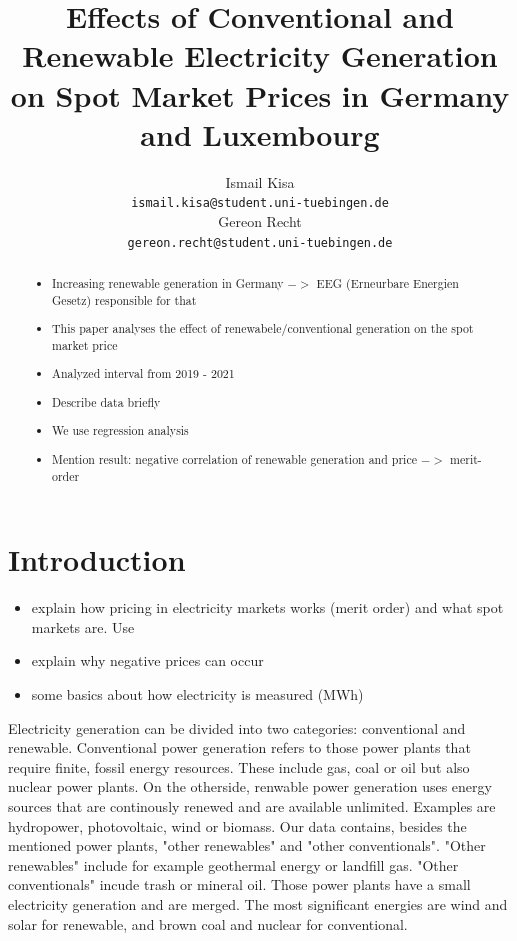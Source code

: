 \documentclass{article}
\title{Effects of Conventional and Renewable Electricity Generation on Spot Market Prices in Germany and Luxembourg}
\author{%
Ismail Kisa\\
\texttt{ismail.kisa@student.uni-tuebingen.de}\\
\And Gereon Recht\\
\texttt{gereon.recht@student.uni-tuebingen.de} \\
}
\begin{document}
\maketitle

\begin{abstract}
\begin{itemize}
    \item Increasing renewable generation in Germany $->$ EEG (Erneurbare Energien Gesetz) responsible for that
    \item This paper analyses the effect of renewabele/conventional generation on the spot market price
    \item Analyzed interval from 2019 - 2021
    \item Describe data briefly
    \item We use regression analysis
    \item Mention result: negative correlation of renewable generation and price $->$ merit-order
\end{itemize}


\end{abstract}

\section{Introduction}

\begin{itemize}
    \item explain how pricing in electricity markets works (merit order) and what spot markets are. 
    Use \citep{markets_for_electrical_energy}
    \item explain why negative prices can occur
    \item some basics about how electricity is measured (MWh)
\end{itemize}

Electricity generation can be divided into two categories: conventional and renewable. Conventional power generation refers to those power plants that require finite, fossil energy resources. These include gas, coal or oil but also nuclear power plants. On the otherside, renwable power generation uses energy sources that are continously renewed and are available unlimited. Examples are hydropower, photovoltaic, wind or biomass. Our data contains, besides the mentioned power plants, "other renewables" and "other conventionals". "Other renewables" include for example geothermal energy or landfill gas. "Other conventionals" incude trash or mineral oil. Those power plants have a small electricity generation and are merged. The most significant energies are wind and solar for renewable, and brown coal and nuclear for conventional. 
\end{document}
